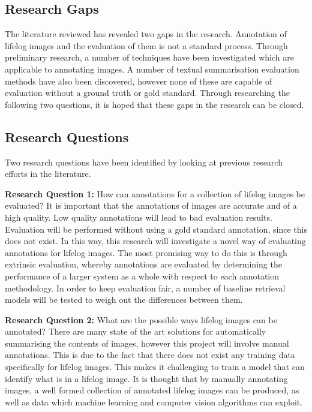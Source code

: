 \documentclass[12pt,a4paper]{article}
\begin{document}
\subsection{Research Gaps}

The literature reviewed has revealed two gaps in the research. Annotation of lifelog images and the evaluation of them is not a standard process. Through preliminary research, a number of techniques have been investigated which are applicable to annotating images. A number of textual summarisation evaluation methods have also been discovered, however none of these are capable of evaluation without a ground truth or gold standard. Through researching the following two questions, it is hoped that these gaps in the research can be closed.

\subsection{Research Questions}

Two research questions have been identified by looking at previous research efforts in the literature. 

\textbf{Research Question 1:} How can annotations for a collection of lifelog images be evaluated? It is important that the annotations of images are accurate and of a high quality. Low quality annotations will lead to bad evaluation results. Evaluation will be performed without using a gold standard annotation, since this does not exist. In this way, this research will investigate a novel way of evaluating annotations for lifelog images. The most promising way to do this is through extrinsic evaluation, whereby annotations are evaluated by determining the performance of a larger system as a whole with respect to each annotation methodology. In order to keep evaluation fair, a number of baseline retrieval models will be tested to weigh out the differences between them.

\textbf{Research Question 2:} What are the possible ways lifelog images can be annotated? There are many state of the art solutions for automatically summarising the contents of images, however this project will involve manual annotations. This is due to the fact that there does not exist any training data specifically for lifelog images. This makes it challenging to train a model that can identify what is in a lifelog image. It is thought that by manually annotating images, a well formed collection of annotated lifelog images can be produced, as well as data which machine learning and computer vision algorithms can exploit.
\end{document}

